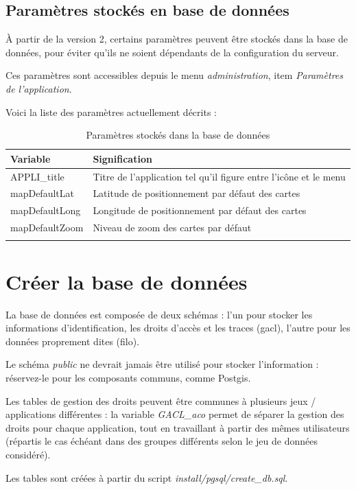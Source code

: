 \subsection{Paramètres stockés en base de données}
\label{paramdb}

À partir de la version 2, certains paramètres peuvent être stockés dans la base de données, pour éviter qu'ils ne soient dépendants de la configuration du serveur.

Ces paramètres sont accessibles depuis le menu \textit{administration}, item \textit{Paramètres de l'application}.

Voici la liste des paramètres actuellement décrits :
\begin{longtable}{|p{4cm}|p{11cm}|}
\hline
\textbf{Variable} & \textbf{Signification} \\
\hline
\endhead
APPLI\_title & Titre de l'application tel qu'il figure entre l'icône et le menu\\
\hline
mapDefaultLat & Latitude de positionnement par défaut des cartes \\
\hline
mapDefaultLong & Longitude de positionnement par défaut des cartes \\
\hline
mapDefaultZoom & Niveau de zoom des cartes par défaut \\
\hline
\caption{Paramètres stockés dans la base de données}
\end{longtable}


\section{Créer la base de données}

La base de données est composée de deux schémas : l'un pour stocker les informations d'identification, les droits d'accès et les traces (gacl), l'autre pour les données proprement dites (filo).

Le schéma \textit{public} ne devrait jamais être utilisé pour stocker l'information : réservez-le pour les composants communs, comme Postgis.

Les tables de gestion des droits peuvent être communes à plusieurs jeux / applications différentes : la variable \textit{GACL\_aco} permet de séparer la gestion des droits pour chaque application, tout en travaillant à partir des mêmes utilisateurs (répartis le cas échéant dans des groupes différents selon le jeu de données considéré).

Les tables sont créées à partir du script \textit{install/pgsql/create\_db.sql}.


